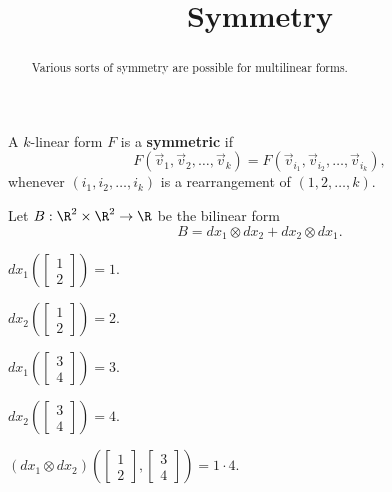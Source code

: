 \documentclass{ximera}
\title{Symmetry}
\begin{document}
\begin{abstract}
  Various sorts of symmetry are possible for multilinear forms.
\end{abstract}\maketitle

\begin{definition}	
 A $k$-linear form $F$ is a \textbf{symmetric} if 
 $$
 F(\vec{v}_1, \vec{v}_2, \ldots, \vec{v}_k) = F(\vec{v}_{i_1}, \vec{v}_{i_2}, \ldots, \vec{v}_{i_k}),
 $$
 whenever $(i_1,i_2,\ldots,i_k)$ is a rearrangement of $(1,2,\ldots,k)$.
\end{definition}

\begin{question}
  Let $B : \R^2 \times \R^2 \to \R$ be the bilinear form
  $$
  B = dx_1 \otimes dx_2 + dx_2 \otimes dx_1.
  $$
  \begin{solution}
    \begin{hint}
      $dx_1 \left( \begin{bmatrix} 1 \\ 2 \end{bmatrix} \right) = 1$.
    \end{hint}
    \begin{hint}
      $dx_2 \left( \begin{bmatrix} 1 \\ 2 \end{bmatrix} \right) = 2$.
    \end{hint}
    \begin{hint}
      $dx_1 \left( \begin{bmatrix} 3 \\ 4 \end{bmatrix} \right) = 3$.
    \end{hint}
    \begin{hint}
      $dx_2 \left( \begin{bmatrix} 3 \\ 4 \end{bmatrix} \right) = 4$.
    \end{hint}
    \begin{hint}
      $(dx_1 \otimes dx_2) \left( \begin{bmatrix} 1 \\ 2 \end{bmatrix}, \begin{bmatrix} 3 \\ 4 \end{bmatrix} \right) = 1 \cdot 4$.

\end{hint}
\end{solution}
\end{question}
\end{document}
